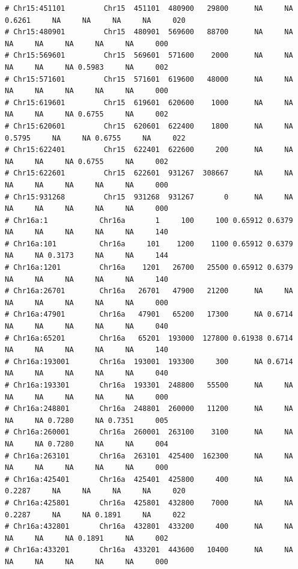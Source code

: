\documentclass{article}\usepackage[]{graphicx}\usepackage[]{color}
\makeatletter
\newenvironment{kframe}{%
 \def\at@end@of@kframe{}%
 \ifinner\ifhmode%
  \def\at@end@of@kframe{\end{minipage}}%
  \begin{minipage}{\columnwidth}%
 \fi\fi%
 \def\FrameCommand##1{\hskip\@totalleftmargin \hskip-\fboxsep
 \colorbox{shadecolor}{##1}\hskip-\fboxsep
     \hskip-\linewidth \hskip-\@totalleftmargin \hskip\columnwidth}%
 \MakeFramed {\advance\hsize-\width
   \@totalleftmargin\z@ \linewidth\hsize
   \@setminipage}}%
 {\par\unskip\endMakeFramed%
 \at@end@of@kframe}
\newenvironment{knitrout}{}{} %
\makeatother
\begin{document}
\begin{knitrout}
\begin{kframe}
\begin{verbatim}
# Chr15:451101         Chr15  451101  480900   29800      NA     NA 0.6261     NA     NA     NA     NA     020
# Chr15:480901         Chr15  480901  569600   88700      NA     NA     NA     NA     NA     NA     NA     000
# Chr15:569601         Chr15  569601  571600    2000      NA     NA     NA     NA     NA 0.5983     NA     002
# Chr15:571601         Chr15  571601  619600   48000      NA     NA     NA     NA     NA     NA     NA     000
# Chr15:619601         Chr15  619601  620600    1000      NA     NA     NA     NA     NA 0.6755     NA     002
# Chr15:620601         Chr15  620601  622400    1800      NA     NA 0.5795     NA     NA 0.6755     NA     022
# Chr15:622401         Chr15  622401  622600     200      NA     NA     NA     NA     NA 0.6755     NA     002
# Chr15:622601         Chr15  622601  931267  308667      NA     NA     NA     NA     NA     NA     NA     000
# Chr15:931268         Chr15  931268  931267       0      NA     NA     NA     NA     NA     NA     NA     000
# Chr16a:1            Chr16a       1     100     100 0.65912 0.6379     NA     NA     NA     NA     NA     140
# Chr16a:101          Chr16a     101    1200    1100 0.65912 0.6379     NA     NA 0.3173     NA     NA     144
# Chr16a:1201         Chr16a    1201   26700   25500 0.65912 0.6379     NA     NA     NA     NA     NA     140
# Chr16a:26701        Chr16a   26701   47900   21200      NA     NA     NA     NA     NA     NA     NA     000
# Chr16a:47901        Chr16a   47901   65200   17300      NA 0.6714     NA     NA     NA     NA     NA     040
# Chr16a:65201        Chr16a   65201  193000  127800 0.61938 0.6714     NA     NA     NA     NA     NA     140
# Chr16a:193001       Chr16a  193001  193300     300      NA 0.6714     NA     NA     NA     NA     NA     040
# Chr16a:193301       Chr16a  193301  248800   55500      NA     NA     NA     NA     NA     NA     NA     000
# Chr16a:248801       Chr16a  248801  260000   11200      NA     NA     NA     NA 0.7280     NA 0.7351     005
# Chr16a:260001       Chr16a  260001  263100    3100      NA     NA     NA     NA 0.7280     NA     NA     004
# Chr16a:263101       Chr16a  263101  425400  162300      NA     NA     NA     NA     NA     NA     NA     000
# Chr16a:425401       Chr16a  425401  425800     400      NA     NA 0.2287     NA     NA     NA     NA     020
# Chr16a:425801       Chr16a  425801  432800    7000      NA     NA 0.2287     NA     NA 0.1891     NA     022
# Chr16a:432801       Chr16a  432801  433200     400      NA     NA     NA     NA     NA 0.1891     NA     002
# Chr16a:433201       Chr16a  433201  443600   10400      NA     NA     NA     NA     NA     NA     NA     000

\end{verbatim}
\end{kframe}
\end{knitrout}
\end{document}
